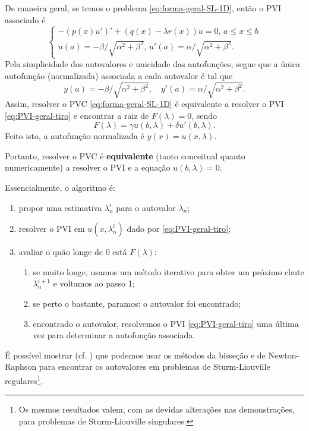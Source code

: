 \documentclass[twocolumn,showpacs,%
  nofootinbib,aps,superscriptaddress,%
  eqsecnum,prd,notitlepage,showkeys,10pt]{revtex4-1}
\renewcommand{\leq}{\leqslant}
\begin{document}
De maneira geral, se temos o problema \eqref{eq:forma-geral-SL-1D}, então o PVI associado é
%
\begin{equation}
\label{eq:PVI-geral-tiro}
    \left\{
        \begin{array}{l}
            -(p(x)u')' + (q(x) - \lambda r(x))u = 0, \, a \leq x \leq b \\
            u(a) = -\beta/\sqrt{\alpha^2 + \beta^2}, \,
            u'(a) = \alpha/\sqrt{\alpha^2 + \beta^2}.
        \end{array}
    \right.
\end{equation}
%
Pela simplicidade dos autovalores e unicidade das autofunções,
segue que a única autofunção (normalizada) associada a cada autovalor é tal que
%
\[
    y(a) = -\beta/\sqrt{\alpha^2 + \beta^2}, \quad
    y'(a) = \alpha/\sqrt{\alpha^2 + \beta^2}.
\]
%
Assim, resolver o  PVC \eqref{eq:forma-geral-SL-1D} é equivalente a resolver o PVI \eqref{eq:PVI-geral-tiro}
e encontrar a raiz de $F(\lambda) = 0$, sendo
%
\begin{equation}
\label{eq:eq-algebrica-tiro}
    F(\lambda) = \gamma u(b, \lambda) + \delta u'(b, \lambda).
\end{equation}
%
Feito isto, a autofunção normalizada é $y(x) = u(x,\lambda)$.

Portanto, resolver o PVC é \textbf{equivalente} (tanto conceitual quanto numericamente)
a resolver o PVI e a equação $u(b,\lambda) = 0$.

Essencialmente, o algoritmo é:
%
\begin{enumerate}
    \item propor uma estimativa $\lambda_n^i$ para o autovalor $\lambda_n$; 
    \item resolver o PVI em $u(x, \lambda_n^i)$ dado por \eqref{eq:PVI-geral-tiro};
    \item avaliar o quão longe de $0$ está $F(\lambda)$:
    \begin{enumerate}
        \item se muito longe, usamos um método iterativo para obter um próximo 
        chute $\lambda_n^{i+1}$ e voltamos ao passo 1;
        \item se perto o bastante, paramos: o autovalor foi encontrado;
        \item encontrado o autovalor, resolvemos o PVI \eqref{eq:PVI-geral-tiro} uma
        última vez para determinar a autofunção associada.
    \end{enumerate}
\end{enumerate}
%
É possível mostrar (cf. \cite[p.~304-305, Teo.~186 - 188]{Sturm-Liouville}) que
podemos usar os métodos da bisseção e de Newton-Raphson para encontrar os autovalores
em problemas de Sturm-Liouville regulares\footnote{Os mesmos resultados valem, com as devidas
alterações nas demonstrações, para problemas de Sturm-Liouville singulares.}.
\end{document}
